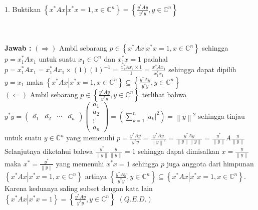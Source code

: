 \documentclass[11pt,a4paper]{article}
\newcommand{\ds}{\displaystyle}
\theoremstyle{plain}
\theoremstyle{definition}
\theoremstyle{remark}
\begin{document}
\begin{enumerate}
\begin{enumerate}
	\- \\ \- \\
	\textbf{Jawab :} $(\Rightarrow)$ Ambil sebarang $p\in \left\{ \left. x^{\ast}Ax \right| x^{\ast}x = 1, x\in \mathbb{C}^{n} \right\}$ sehingga $p= x_{1}^{\ast}Ax_{1}$ untuk suatu $x_{1}\in \mathbb{C}^{n}$ dan $x_{1}^{\ast}x=1$ padahal $p=x_{1}^{\ast}Ax_{1} =x_{1}^{\ast}Ax_{1}\times (1) (1)^{-1}  = \ds \frac{x_{1}^{\ast}Ax_{1}\times 1}{1} = \ds \frac{x_{1}^{\ast}Ax_{1}}{x_{1}^{\ast}x_{1}}$ sehingga dapat dipilih $y=x_{1}$ maka $\left\{ \left. x^{\ast}Ax \right| x^{\ast}x = 1, x\in \mathbb{C}^{n} \right\} \subseteq \left\{ \displaystyle \frac{y^{\ast}Ay}{y^{\ast}y}, y\in \mathbb{C}^{n} \right\}$\\
	$(\Leftarrow)$ Ambil sebarang $p\in \left\{ \displaystyle \frac{y^{\ast}Ay}{y^{\ast}y}, y\in \mathbb{C}^{n} \right\}$ terlihat bahwa $y^{\ast}y = \begin{pmatrix}
	\bar{a_1} & \bar{a_2} & \cdots & \bar{a_{n}} 
	\end{pmatrix} \begin{pmatrix}
	a_1\\ 
	a_2\\ 
	\vdots\\ 
	a_n
	\end{pmatrix} = \left( \displaystyle \sum_{k=1}^{n} |a_{k}|^{2}\right )=\left\| y\right\|^{2}$ sehingga tinjau untuk suatu $y\in \mathbb{C}^{n}$ yang memenuhi $p = \ds \frac{y^{\ast}Ay}{y^{\ast}y} = \frac{y^{\ast}Ay}{\left\| y\right\|^{2}} = \frac{y^{\ast}Ay}{\left\| y\right\|\left\| y\right\|} = \frac{y^{\ast}}{\left\| y\right\|}A\frac{y}{\left\| y\right\|}$ Selanjutnya diketahui bahwa $\ds \frac{y^{\ast}}{\left\| y\right\|} \frac{y}{\left\| y\right\|} = 1$ sehingga dapat dimisalkan $x=\ds \frac{y}{\left\| y\right\|}$ maka $x^{\ast} =\ds \frac{y^{\ast}}{\left\| y\right\|}$ yang memenuhi $x^{\ast}x=1$ sehingga $p$ juga anggota dari himpunan $\left\{ \left. x^{\ast}Ax \right| x^{\ast}x = 1, x\in \mathbb{C}^{n} \right\}$ artinya $ \left\{ \displaystyle \frac{y^{\ast}Ay}{y^{\ast}y}, y\in \mathbb{C}^{n} \right\} \subseteq \left\{ \left. x^{\ast}Ax \right| x^{\ast}x = 1, x\in \mathbb{C}^{n} \right\} $. Karena keduanya saling subset dengan kata lain $ \left\{ \left. x^{\ast}Ax \right| x^{\ast}x = 1 \right\} = \left\{ \displaystyle \frac{y^{\ast}Ay}{y^{\ast}y}, y\in \mathbb{C}^{n} \right\}$ $(Q.E.D.)$\\
	

\end{enumerate}
\end{enumerate}
\end{document}
